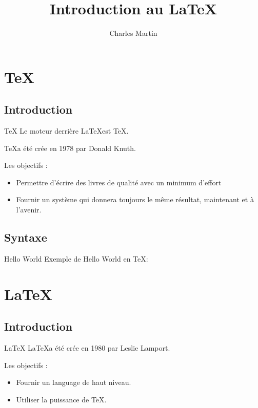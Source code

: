 \documentclass{beamer}
\title{Introduction au \LaTeX}
\author{Charles Martin}
\begin{document}
\frame{\titlepage}


\section{\TeX}	
\subsection{Introduction}
\begin{frame}{\TeX}
  Le moteur derrière \LaTeX est \TeX .
  
  \TeX a été crée en 1978 par Donald Knuth.
  \begin{block}{Les objectifs :}    
   \begin{itemize}
    \item Permettre d’écrire des livres de qualité avec un minimum d’effort
    \item Fournir un système qui donnera toujours le même résultat, maintenant et à l’avenir.
   \end{itemize}
  \end{block}
\end{frame}

\subsection{Syntaxe}
\begin{frame}{Hello World}
	Exemple de Hello World en \TeX :
    
\end{frame}

\section{\LaTeX}
\subsection{Introduction}
\begin{frame}{\LaTeX}
  \LaTeX a été crée en 1980 par Leslie Lamport.
  \begin{block}{Les objectifs :}    
   \begin{itemize}
    \item Fournir un language de haut niveau.
    \item Utiliser la puissance de TeX.
   \end{itemize}
  \end{block}
\end{frame}
\end{document}
